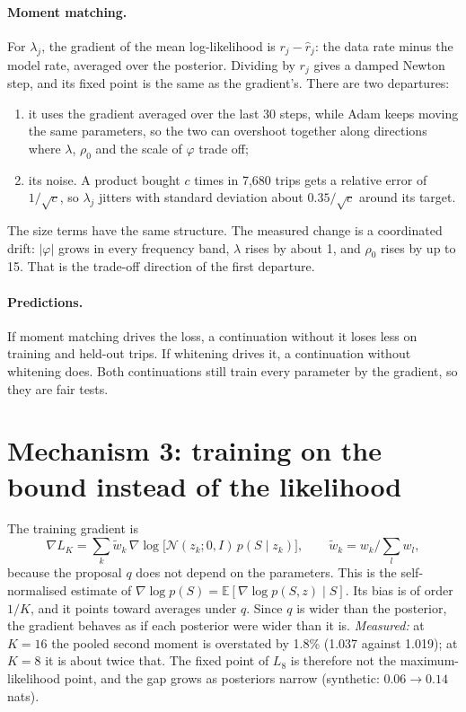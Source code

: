 \documentclass[11pt]{article}
\theoremstyle{remark}\newtheorem{remark}{Remark}
\newcommand{\E}{\mathbb{E}}
\newcommand{\N}{\mathcal{N}}
\begin{document}
\paragraph{Moment matching.} For $\lambda_j$, the gradient of the mean log-likelihood is
$r_j-\hat r_j$: the data rate minus the model rate, averaged over the posterior. Dividing by $r_j$
gives a damped Newton step, and its fixed point is the same as the gradient's. There are two
departures:
\begin{enumerate}
\item it uses the gradient averaged over the last 30 steps, while Adam keeps moving the same
  parameters, so the two can overshoot together along directions where $\lambda$, $\rho_0$ and the
  scale of $\varphi$ trade off;
\item its noise. A product bought $c$ times in 7,680 trips gets a relative error of
  $1/\sqrt c$, so $\lambda_j$ jitters with standard deviation about $0.35/\sqrt c$ around its
  target.
\end{enumerate}
The size terms have the same structure. The measured change is a coordinated drift: $|\varphi|$
grows in every frequency band, $\lambda$ rises by about 1, and $\rho_0$ rises by up to 15. That
is the trade-off direction of the first departure.

\paragraph{Predictions.} If moment matching drives the loss, a continuation without it loses
less on training and held-out trips. If whitening drives it, a continuation without whitening
does. Both continuations still train every parameter by the gradient, so they are fair tests.

\section{Mechanism 3: training on the bound instead of the likelihood}\label{sec:bias}

The training gradient is
\[
\nabla L_K=\sum_k\tilde w_k\,\nabla\log\bigl[\N(z_k;0,I)\,p(S\mid z_k)\bigr],\qquad
\tilde w_k=w_k\Big/\sum_l w_l,
\]
because the proposal $q$ does not depend on the parameters. This is the self-normalised estimate of
$\nabla\log p(S)=\E[\nabla\log p(S,z)\mid S]$. Its bias is of order $1/K$, and it points toward
averages under $q$. Since $q$ is wider than the posterior, the gradient behaves as if each
posterior were wider than it is. \emph{Measured:} at $K=16$ the pooled second moment is
overstated by 1.8\% (1.037 against 1.019); at $K=8$ it is about twice that. The fixed point of
$L_8$ is therefore not the maximum-likelihood point, and the gap grows as posteriors narrow
(synthetic: $0.06\to0.14$ nats).
\end{document}
